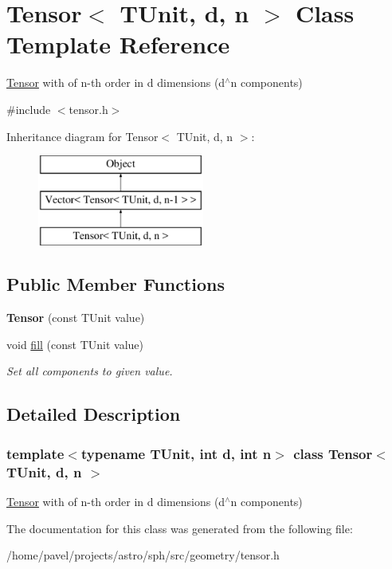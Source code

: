 \hypertarget{classTensor}{}\section{Tensor$<$ T\+Unit, d, n $>$ Class Template Reference}
\label{classTensor}


\hyperlink{classTensor}{Tensor} with of n-\/th order in d dimensions (d$^\wedge$n components)  




{\ttfamily \#include $<$tensor.\+h$>$}

Inheritance diagram for Tensor$<$ T\+Unit, d, n $>$\+:\begin{figure}[H]
\begin{center}
\leavevmode
\includegraphics[height=3.000000cm]{classTensor}
\end{center}
\end{figure}
\subsection*{Public Member Functions}
\begin{DoxyCompactItemize}
\item 
\hypertarget{classTensor_a5cab363af97d9e362d230b3b2fa250ff}{}\label{classTensor_a5cab363af97d9e362d230b3b2fa250ff} 
{\bfseries Tensor} (const T\+Unit value)
\item 
\hypertarget{classTensor_aa07bd5003b545f0c823b75ae35d9d9f0}{}\label{classTensor_aa07bd5003b545f0c823b75ae35d9d9f0} 
void \hyperlink{classTensor_aa07bd5003b545f0c823b75ae35d9d9f0}{fill} (const T\+Unit value)
\begin{DoxyCompactList}\small\item\em Set all components to given value. \end{DoxyCompactList}\end{DoxyCompactItemize}


\subsection{Detailed Description}
\subsubsection*{template$<$typename T\+Unit, int d, int n$>$\newline
class Tensor$<$ T\+Unit, d, n $>$}

\hyperlink{classTensor}{Tensor} with of n-\/th order in d dimensions (d$^\wedge$n components) 

The documentation for this class was generated from the following file\+:\begin{DoxyCompactItemize}
\item 
/home/pavel/projects/astro/sph/src/geometry/tensor.\+h\end{DoxyCompactItemize}
